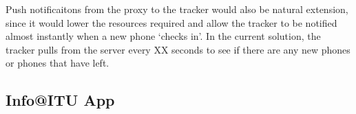 Push notificaitons from the proxy to the tracker would also be natural extension, since it would lower the resources required and allow the tracker to be notified almost instantly when a new phone `checks in'. In the current solution, the tracker pulls from the server every XX seconds to see if there are any new phones or phones that have left.

\subsection{Info@ITU App}

